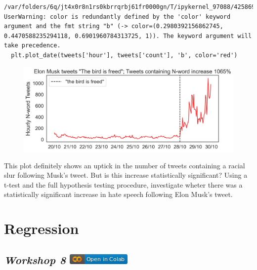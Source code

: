 \documentclass[
  letterpaper,
  DIV=11,
  numbers=noendperiod]{scrreprt}
\begin{document}
\begin{verbatim}
/var/folders/6q/jt4x0r8n1rs0kbrrqrbj61fr0000gn/T/ipykernel_97088/4258694155.py:17: UserWarning: color is redundantly defined by the 'color' keyword argument and the fmt string "b" (-> color=(0.2980392156862745, 0.4470588235294118, 0.6901960784313725, 1)). The keyword argument will take precedence.
  plt.plot_date(tweets['hour'], tweets['count'], 'b', color='red')
\end{verbatim}

\begin{figure}[H]

{\centering \includegraphics{notebooks/W07. Hypothesis Testing_files/figure-pdf/cell-16-output-2.png}

}

\end{figure}

This plot definitely shows an uptick in the number of tweets containing
a racial slur following Musk's tweet. But is this increase statistically
significant? Using a t-test and the full hypothesis testing procedure,
investigate wheter there was a statistically significant increase in
hate speech following Elon Musk's tweet.


\hypertarget{regression}{%
\chapter{Regression}\label{regression}}

\hypertarget{workshop-8-open-in-colab}{%
\section[\emph{Workshop 8} ]{\texorpdfstring{\emph{Workshop 8}
\href{https://colab.research.google.com/github/oballinger/QM2/blob/main/notebooks/W08.\%20Linear\%20Regression.ipynb}{\protect\includegraphics{index_files/mediabag/colab-badge.png}}}{Workshop 8 Open In Colab}}\label{workshop-8-open-in-colab}}
\end{document}
